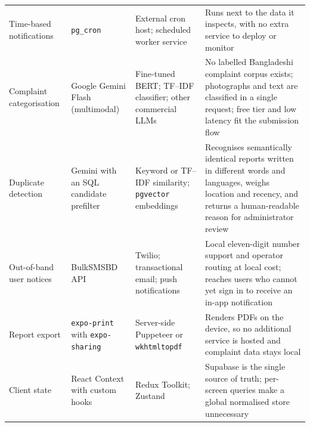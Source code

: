 \documentclass[11pt,a4paper]{article}
\newcommand{\code}[1]{\texttt{\small #1}}
\begin{document}
\begin{xltabular}{\textwidth}{L{2.7cm} L{2.9cm} L{2.9cm} X}
Time-based notifications &
\code{pg\_cron} &
External cron host; scheduled worker service &
Runs next to the data it inspects, with no extra service to deploy or monitor \\
\addlinespace

Complaint categorisation &
Google Gemini Flash (multimodal) &
Fine-tuned BERT; TF--IDF classifier; other commercial LLMs &
No labelled Bangladeshi complaint corpus exists; photographs and text are
classified in a single request; free tier and low latency fit the submission
flow \\
\addlinespace

Duplicate detection &
Gemini with an SQL candidate prefilter &
Keyword or TF--IDF similarity; \code{pgvector} embeddings &
Recognises semantically identical reports written in different words and
languages, weighs location and recency, and returns a human-readable reason for
administrator review \\
\addlinespace

Out-of-band user notices &
BulkSMSBD API &
Twilio; transactional email; push notifications &
Local eleven-digit number support and operator routing at local cost; reaches
users who cannot yet sign in to receive an in-app notification \\
\addlinespace

Report export &
\code{expo-print} with \code{expo-sharing} &
Server-side Puppeteer or \code{wkhtmltopdf} &
Renders PDFs on the device, so no additional service is hosted and complaint data
stays local \\
\addlinespace

Client state &
React Context with custom hooks &
Redux Toolkit; Zustand &
Supabase is the single source of truth; per-screen queries make a global
normalised store unnecessary \\

\end{xltabular}
\end{document}
